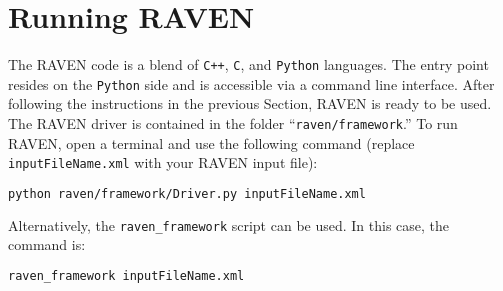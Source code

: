 
\section{Running RAVEN}
\label{HowToRun}

The RAVEN code is a blend of \texttt{C++}, \texttt{C}, and \texttt{Python} languages. The entry point
resides on the \texttt{Python} side and is accessible via a command line interface.
%
After following the instructions in the previous Section, RAVEN is ready to be
used.
%
The RAVEN driver is contained in the folder ``\texttt{raven/framework}.''
%
To run RAVEN, open a terminal and use the following command (replace \texttt{inputFileName.xml} with your RAVEN input file):

\begin{lstlisting}[language=bash]
python raven/framework/Driver.py inputFileName.xml
\end{lstlisting}

Alternatively, the \texttt{raven\_framework} script can be used.  In this case, the command is:

\begin{lstlisting}[language=bash]
raven_framework inputFileName.xml
\end{lstlisting}

